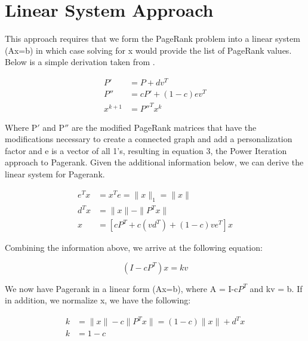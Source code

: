 \documentclass[letterpaper,12pt,onecolumn]{article}
\begin{document}
\section{Linear System Approach}
This approach requires that we form the PageRank problem into a linear system (Ax=b) in which case solving for x would provide the list of PageRank values. Below is a simple derivation taken from \cite{Fast Parallel}.
\begin{center}
\begin{align}
	P' &= P + dv^{T} \\
	P'' &= cP' + (1-c)ev^{T} \\
	x^{k+1} &= P''^{T}x^{k}
\end{align}

\end{center}
Where P$'$ and P$''$ are the modified PageRank matrices that have the modifications necessary to create a connected graph and add a personalization factor and e is a vector of all 1's, resulting in equation 3, the Power Iteration approach to Pagerank.
\newline
\linebreak
Given the additional information below, we can derive the linear system for Pagerank.


\begin{center}
\begin{align}
  e^{T}x & = x^{T}e = \|x\|_{1} = \|x\| \\
  d^{T}x &= \| x\| - \| P^{T}x\| \\
  x &= [cP^{T} + c(vd^{T}) + (1-c)ve^{T}]x
\end{align}
\end{center}

Combining the information above, we arrive at the following equation:

\begin{center}
\begin{equation}
  (I-cP^{T})x = kv
\end{equation}
\end{center}
We now have Pagerank in a linear form (Ax=b), where A = I-c$P^{T}$ and kv = b. If in addition, we normalize x, we have the following:

\begin{center}
  \begin{align}
	k &= \|x\| - c \|P^{T}x\| = (1-c) \|x\| + d^{T}x \\	
	k &= 1-c 
  \end{align}
\end{center}
\end{document}
